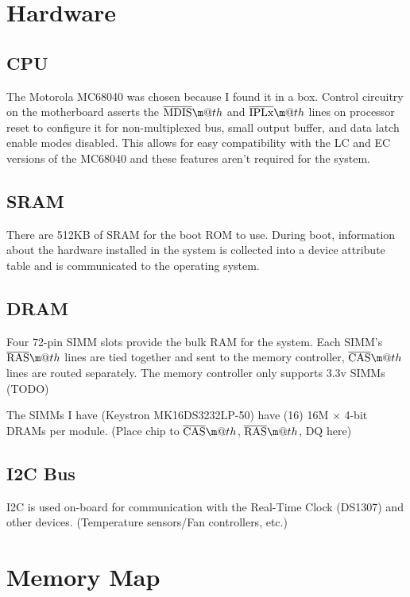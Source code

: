 \documentclass{article}
\makeatletter
\newcommand*{\textoverline}[1]{$\overline{\hbox{#1}}\m@th$}
\makeatother
\begin{document}
\section{Hardware}

\subsection{CPU}

The Motorola MC68040 was chosen because I found it in a box. Control circuitry
on the motherboard asserts the \textoverline{MDIS} and \textoverline{IPLx} lines
on processor reset to configure it for non-multiplexed bus, small output buffer,
and data latch enable modes disabled. This allows for easy compatibility with
the LC and EC versions of the MC68040 and these features aren't required for
the system.

\subsection{SRAM}

There are 512KB of SRAM for the boot ROM to use. During boot, information about
the hardware installed in the system is collected into a device attribute table
and is communicated to the operating system.

\subsection{DRAM}

Four 72-pin SIMM slots provide the bulk RAM for the system. Each SIMM's
\textoverline{RAS} lines are tied together and sent to the memory controller,
\textoverline{CAS} lines are routed separately. The memory controller only
supports 3.3v SIMMs (TODO)

The SIMMs I have (Keystron MK16DS3232LP-50) have (16) 16M $\times$ 4-bit DRAMs
per module. (Place chip to \textoverline{CAS}, \textoverline{RAS}, DQ here)

\subsection{I2C Bus}

I2C is used on-board for communication with the Real-Time Clock (DS1307) and
other devices. (Temperature sensors/Fan controllers, etc.)

\section{Memory Map}
\end{document}
